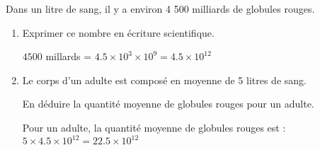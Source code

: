     Dans un litre de sang, il y a environ 4 500 milliards de globules rouges.
    \begin{enumerate}
        \item Exprimer ce nombre en écriture scientifique.

        {\red $\num{4500}$ millards = $\num{4.5}\times 10^3\times 10^9 = \num{4.5}\times 10^{12}$}
        \item Le corps d’un adulte est composé en moyenne de 5 litres de sang.

        En déduire la quantité moyenne de globules rouges pour un adulte.

        {\red Pour un adulte, la quantité moyenne de globules rouges est : $5\times \num{4.5}\times 10^{12} = \num{22.5}\times 10^{12}$}
    \end{enumerate}
